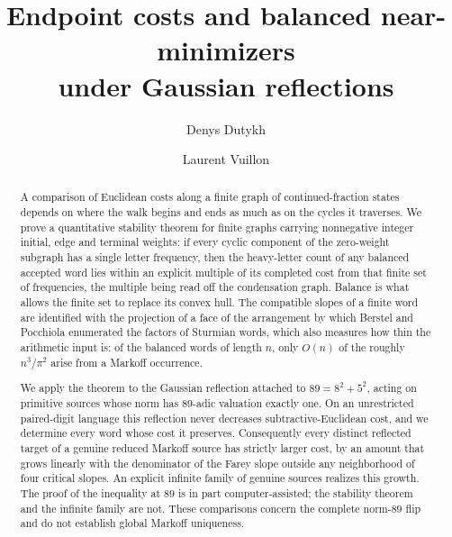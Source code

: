 \documentclass[11pt,reqno]{amsart}
\title[Endpoint costs and balanced near-minimizers]{Endpoint costs and balanced near-minimizers\\under Gaussian reflections}
\author{Denys Dutykh}
\author{Laurent Vuillon}
\theoremstyle{definition}
\theoremstyle{definition}
\begin{document}
\begin{abstract}
A comparison of Euclidean costs along a finite graph of
continued-fraction states depends on where the walk begins and ends as
much as on the cycles it traverses. We prove a quantitative stability
theorem for finite graphs carrying nonnegative integer initial, edge and
terminal weights: if every cyclic component of the zero-weight subgraph
has a single letter frequency, then the heavy-letter count of any
balanced accepted word lies within an explicit multiple of its completed
cost from that finite set of frequencies, the multiple being read off the
condensation graph. Balance is what allows the finite set to replace its
convex hull. The compatible slopes of a finite word are identified with the
projection of a face of the arrangement by which Berstel and Pocchiola
enumerated the factors of Sturmian words, which also measures how thin the
arithmetic input is: of the balanced words of length $n$, only $O(n)$ of the
roughly $n^3/\pi^2$ arise from a Markoff occurrence.

We apply the theorem to the Gaussian reflection attached to $89=8^2+5^2$,
acting on primitive sources whose norm has $89$-adic valuation exactly
one. On an unrestricted paired-digit language this reflection never
decreases subtractive-Euclidean cost, and we determine every word whose
cost it preserves. Consequently every distinct reflected target of a
genuine reduced Markoff source has strictly larger cost, by an amount
that grows linearly with the denominator of the Farey slope outside any
neighborhood of four critical slopes. An explicit infinite family of
genuine sources realizes this growth. The proof of the inequality at $89$
is in part computer-assisted; the stability theorem and the infinite
family are not. These comparisons concern the complete norm-$89$ flip and
do not establish global Markoff uniqueness.
\end{abstract}
\maketitle








\raggedbottom
\end{document}

